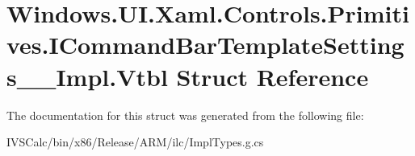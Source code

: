 \hypertarget{struct_windows_1_1_u_i_1_1_xaml_1_1_controls_1_1_primitives_1_1_i_command_bar_template_settings_____impl_1_1_vtbl}{}\section{Windows.\+U\+I.\+Xaml.\+Controls.\+Primitives.\+I\+Command\+Bar\+Template\+Settings\+\_\+\+\_\+\+Impl.\+Vtbl Struct Reference}
\label{struct_windows_1_1_u_i_1_1_xaml_1_1_controls_1_1_primitives_1_1_i_command_bar_template_settings_____impl_1_1_vtbl}


The documentation for this struct was generated from the following file\+:\begin{DoxyCompactItemize}
\item 
I\+V\+S\+Calc/bin/x86/\+Release/\+A\+R\+M/ilc/Impl\+Types.\+g.\+cs\end{DoxyCompactItemize}
